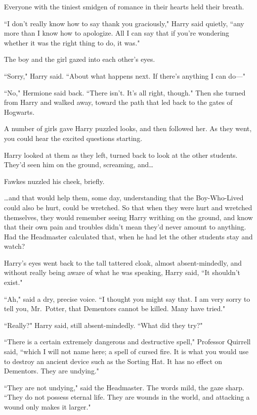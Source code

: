 Everyone with the tiniest smidgen of romance in their hearts held their breath.

``I don't really know how to say thank you graciously," Harry said quietly, ``any more than I know how to apologize. All I can say that if you're wondering whether it was the right thing to do, it was."

The boy and the girl gazed into each other's eyes.

``Sorry," Harry said. ``About what happens next. If there's anything I can do—"

``No," Hermione said back. ``There isn't. It's all right, though." Then she turned from Harry and walked away, toward the path that led back to the gates of Hogwarts.

A number of girls gave Harry puzzled looks, and then followed her. As they went, you could hear the excited questions starting.

Harry looked at them as they left, turned back to look at the other students. They'd seen him on the ground, screaming, and{\ldots}

Fawkes nuzzled his cheek, briefly.

{\ldots}and that would help them, some day, understanding that the Boy-Who-Lived could also be hurt, could be wretched. So that when they were hurt and wretched themselves, they would remember seeing Harry writhing on the ground, and know that their own pain and troubles didn't mean they'd never amount to anything. Had the Headmaster calculated that, when he had let the other students stay and watch?

Harry's eyes went back to the tall tattered cloak, almost absent-mindedly, and without really being aware of what he was speaking, Harry said, ``It shouldn't exist."

``Ah," said a dry, precise voice. ``I thought you might say that. I am very sorry to tell you, Mr.~Potter, that Dementors cannot be killed. Many have tried."

``Really?" Harry said, still absent-mindedly. ``What did they try?"

``There is a certain extremely dangerous and destructive spell," Professor Quirrell said, ``which I will not name here; a spell of cursed fire. It is what you would use to destroy an ancient device such as the Sorting Hat. It has no effect on Dementors. They are undying."

``They are not undying," said the Headmaster. The words mild, the gaze sharp. ``They do not possess eternal life. They are wounds in the world, and attacking a wound only makes it larger."

